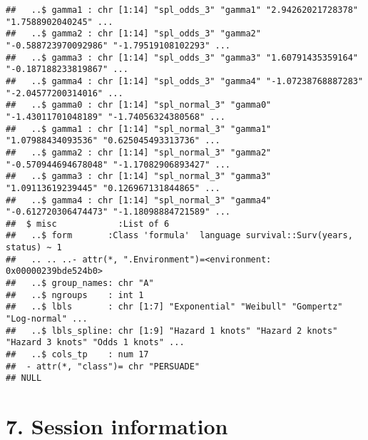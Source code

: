 \documentclass[
]{article}
\begin{document}
\begin{verbatim}
##   ..$ gamma1 : chr [1:14] "spl_odds_3" "gamma1" "2.94262021728378" "1.7588902040245" ...
##   ..$ gamma2 : chr [1:14] "spl_odds_3" "gamma2" "-0.588723970092986" "-1.79519108102293" ...
##   ..$ gamma3 : chr [1:14] "spl_odds_3" "gamma3" "1.60791435359164" "-0.187188233819867" ...
##   ..$ gamma4 : chr [1:14] "spl_odds_3" "gamma4" "-1.07238768887283" "-2.04577200314016" ...
##   ..$ gamma0 : chr [1:14] "spl_normal_3" "gamma0" "-1.43011701048189" "-1.74056324380568" ...
##   ..$ gamma1 : chr [1:14] "spl_normal_3" "gamma1" "1.07988434093536" "0.625045493313736" ...
##   ..$ gamma2 : chr [1:14] "spl_normal_3" "gamma2" "-0.570944694678048" "-1.17082906893427" ...
##   ..$ gamma3 : chr [1:14] "spl_normal_3" "gamma3" "1.09113619239445" "0.126967131844865" ...
##   ..$ gamma4 : chr [1:14] "spl_normal_3" "gamma4" "-0.612720306474473" "-1.18098884721589" ...
##  $ misc            :List of 6
##   ..$ form       :Class 'formula'  language survival::Surv(years, status) ~ 1
##   .. .. ..- attr(*, ".Environment")=<environment: 0x00000239bde524b0> 
##   ..$ group_names: chr "A"
##   ..$ ngroups    : int 1
##   ..$ lbls       : chr [1:7] "Exponential" "Weibull" "Gompertz" "Log-normal" ...
##   ..$ lbls_spline: chr [1:9] "Hazard 1 knots" "Hazard 2 knots" "Hazard 3 knots" "Odds 1 knots" ...
##   ..$ cols_tp    : num 17
##  - attr(*, "class")= chr "PERSUADE"
## NULL
\end{verbatim}

\clearpage

\section{7. Session information}\label{session-information}
\end{document}
